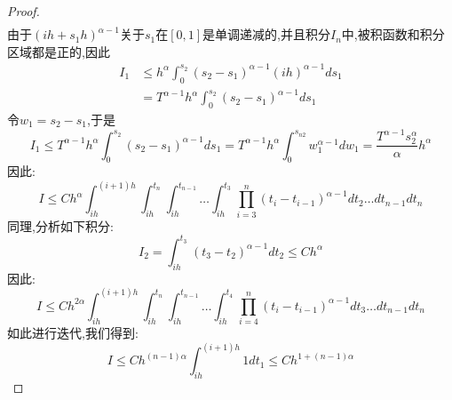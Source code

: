\begin{proof}
\begin{align*}
	\end{align*}
	由于$(ih + s_1h)^{\alpha - 1}$关于$s_1$在$[0,1]$是单调递减的,并且积分$I_n$中,被积函数和积分区域都是正的,因此
	\begin{align*}
		I_1 &\le h^{\alpha}\int_{0}^{s_{2}} (s_{2}-s_{1})^{\alpha -1} (ih)^{\alpha - 1} ds_1 \\
		&=  T^{\alpha - 1}h^{\alpha}\int_{0}^{s_{2}} (s_{2}-s_{1})^{\alpha -1} ds_1
	\end{align*}
	令$w_1=s_{2}-s_{1}$,于是
	\begin{equation*}
		I_1\le T^{\alpha - 1}h^{\alpha}\int_{0}^{s_{2}} (s_{2}-s_{1})^{\alpha -1} ds_1
		=  T^{\alpha - 1}h^{\alpha}\int_{0}^{s_{n2}} w_1^{\alpha -1} dw_1
		=  \frac{T^{\alpha - 1}s_{2}^\alpha}{\alpha}h^{\alpha}
	\end{equation*}
	因此:
	\begin{equation*}
		I \le Ch^\alpha
		\int_{ih}^{(i+1)h}\int_{ih}^{t_n}\int_{ih}^{t_{n-1}} \ldots \int_{ih}^{t_{3}} 
		\prod_{i=3}^{n}(t_i-t_{i-1})^{\alpha -1} dt_{2} \ldots dt_{n-1}dt_n
	\end{equation*}
	同理,分析如下积分:
	\begin{equation*}
		I_{2} = \int_{ih}^{t_{3}}(t_{3}-t_{2})^{\alpha -1}
		dt_{2} \le Ch^\alpha 
	\end{equation*}
	因此:
	\begin{equation*}
		I \le Ch^{2\alpha}
		\int_{ih}^{(i+1)h}\int_{ih}^{t_n}\int_{ih}^{t_{n-1}} \ldots \int_{ih}^{t_{4}} 
		\prod_{i=4}^{n}(t_i-t_{i-1})^{\alpha -1} dt_{3} \ldots dt_{n-1}dt_n
	\end{equation*}
	如此进行迭代,我们得到:
	\begin{equation*}
		I \le Ch^{(n-1)\alpha}\int_{ih}^{(i+1)h} 1 dt_1 \le Ch^{1+(n-1)\alpha}
	\end{equation*}
\end{proof}

